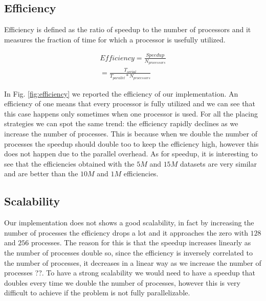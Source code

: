 \subsection{Efficiency}
Efficiency is defined as the ratio of speedup to the
number of processors and it measures the fraction of
time for which a processor is usefully utilized.

\begin{equation}
  \begin{split}
    Efficiency = \frac{Speedup}{N_{processors}} \\
    = \frac{T_{serial}}{T_{parallel} * N_{processors}}
  \end{split}
\end{equation}

In Fig. \ref{fig:efficiency} we reported the efficiency of our implementation.
An efficiency of one means that every processor is fully utilized and we can see that
this case happens only sometimes when one processor is used.
For all the placing strategies we can spot the same trend: the efficiency rapidly declines as we
increase the number of processes. This is because when we double the number of processes the speedup should
double too to keep the efficiency high, however this does not happen due to the parallel overhead.
As for speedup, it is interesting to see that the efficiencies obtained with the $5M$ and $15M$ datasets are very similar and are
better than the $10M$ and $1M$ efficiencies.

\subsection{Scalability}
Our implementation does not shows a good scalability, in fact by increasing the
number of processes the efficiency drops a lot and it approaches the zero with
$128$ and $256$ processes. The reason for this is that the speedup increases linearly as
the number of processes double so, since the efficiency is inversely correlated to the number
of processes, it decreases in a linear way as we increase the number of processes ??.
To have a strong scalability we would need to have a speedup that doubles every time we double the
number of processes, however this is very difficult to achieve if the problem
is not fully parallelizable.